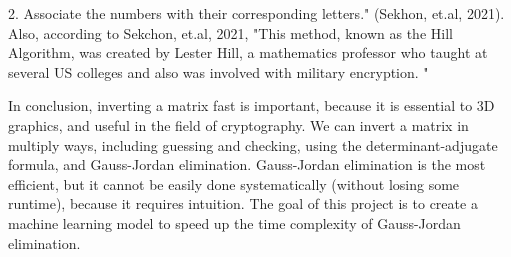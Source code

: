 \documentclass{article}
\begin{document}
2. Associate the numbers with their corresponding letters." (Sekhon, et.al, 2021). \\ Also, according to Sekchon, et.al, 2021, "This method, known as the Hill Algorithm, was created by Lester Hill, a mathematics professor who taught at several US colleges and also was involved with military encryption. "
\par In conclusion, inverting a matrix fast is important, because it is essential to 3D graphics, and useful in the field of cryptography. We can invert a matrix in multiply ways, including guessing and checking, using the determinant-adjugate formula, and Gauss-Jordan elimination. Gauss-Jordan elimination is the most efficient, but it cannot be easily done systematically (without losing some runtime), because it requires intuition. The goal of this project is to create a machine learning model to speed up the time complexity of Gauss-Jordan elimination. 
\newpage
\end{document}
